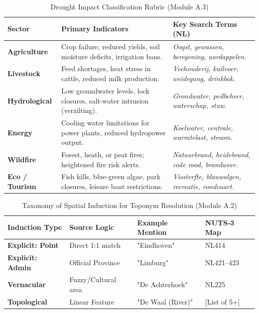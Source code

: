 \begin{table}[h!]
\centering
\caption{Drought Impact Classification Rubric (Module A.3)}
\label{tab:sector_rubric}
\renewcommand{\arraystretch}{1.5}
\begin{tabularx}{\textwidth}{@{} l >{\RaggedRight}X >{\RaggedRight}X @{}}
\toprule
\textbf{Sector} & \textbf{Primary Indicators} & \textbf{Key Search Terms (NL)} \\ \midrule
\textbf{Agriculture} & Crop failure, reduced yields, soil moisture deficits, irrigation bans. & \textit{Oogst, gewassen, beregening, aardappelen.} \\
\textbf{Livestock} & Feed shortages, heat stress in cattle, reduced milk production. & \textit{Veehouderij, kuilvoer, weidegang, drinkbak.} \\
\textbf{Hydrological} & Low groundwater levels, lock closures, salt-water intrusion (verzilting). & \textit{Grondwater, peilbeheer, waterschap, stuw.} \\
\textbf{Energy} & Cooling water limitations for power plants, reduced hydropower output. & \textit{Koelwater, centrale, warmtelast, stroom.} \\
\textbf{Wildfire} & Forest, heath, or peat fires; heightened fire risk alerts. & \textit{Natuurbrand, heidebrand, code rood, brandweer.} \\
\textbf{Eco / Tourism} & Fish kills, blue-green algae, park closures, leisure boat restrictions. & \textit{Vissterfte, blauwalgen, recreatie, rondvaart.} \\ \bottomrule
\end{tabularx}
\end{table}

\begin{table}[h!]
\centering
\caption{Taxonomy of Spatial Induction for Toponym Resolution (Module A.2)}
\label{tab:induction_rubric}
\renewcommand{\arraystretch}{1.4}
\begin{tabularx}{\textwidth}{@{} l >{\RaggedRight}p{3cm} >{\RaggedRight}X l @{}}
\toprule
\textbf{Induction Type} & \textbf{Source Logic} & \textbf{Example Mention} & \textbf{NUTS-3 Map} \\ \midrule
\rowcolor[gray]{0.95} \textbf{Explicit: Point} & Direct 1:1 match & "Eindhoven" & NL414 \\
\textbf{Explicit: Admin} & Official Province & "Limburg" & NL421–423 \\
\rowcolor[gray]{0.95} \textbf{Vernacular} & Fuzzy/Cultural area & "De Achterhoek" & NL225 \\
\textbf{Topological} & Linear Feature & "De Waal (River)" & [List of 5+] \\ \bottomrule
\end{tabularx}
\end{table}

